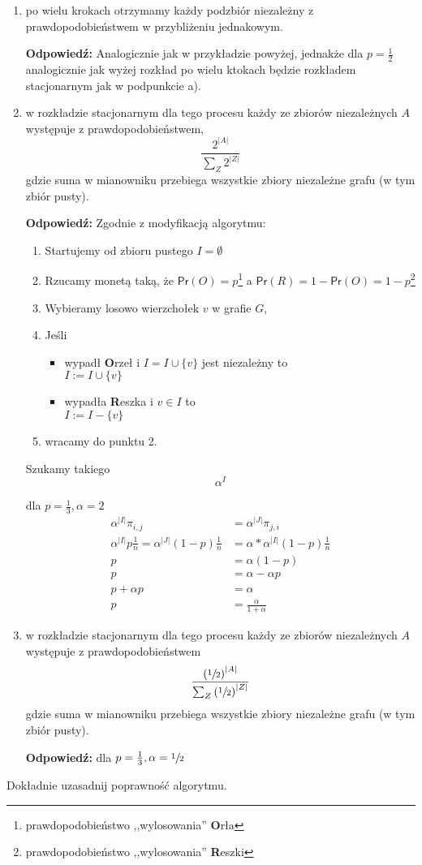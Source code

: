 \documentclass[a4paper,12pt]{article}
\theoremstyle{definition}%
\theoremstyle{definition}
\theoremstyle{problem}
\begin{document}
\begin{enumerate}[label=\alph*)]
\item po wielu krokach otrzymamy każdy podzbiór niezależny z prawdopodobieństwem w przybliżeniu jednakowym.

\textbf{Odpowiedź: }Analogicznie jak w przykładzie powyżej, jednakże dla $p= \frac{1}{2}$ analogicznie jak wyżej rozkład po wielu ktokach będzie rozkładem stacjonarnym jak w podpunkcie a).
\item w rozkładzie stacjonarnym dla tego procesu każdy ze zbiorów niezależnych $A$ występuje z prawdopodobieństwem, 
$$\frac{2^{|A|}}{\sum _Z2^{|Z|}}$$
gdzie suma w mianowniku przebiega wszystkie zbiory niezależne grafu (w tym zbiór pusty).

\textbf{Odpowiedź: } Zgodnie z modyfikacją algorytmu: 
\begin{enumerate}[label=\arabic*.]
\item Startujemy od zbioru pustego $I=\emptyset $
\item Rzucamy monetą taką, że $\mathsf{Pr}(O)=p$\footnote{prawdopodobieństwo ,,wylosowania'' \textbf{O}rła} a $\mathsf{Pr}(R)=1-\mathsf{Pr}(O)=1-p$\footnote{prawdopodobieństwo ,,wylosowania'' \textbf{R}eszki}
\item Wybieramy losowo wierzchołek $v$ w grafie $G$,
\item Jeśli 
\begin{itemize}
\item[] wypadł \textbf{O}rzeł i $I=I\cup \{v\}$ jest niezależny to\\
$I:=I\cup \{v\}$
\item[] wypadła \textbf{R}eszka i $v\in I$ to\\
$I:=I- \{v\}$
\end{itemize}
\item wracamy do punktu 2.
\end{enumerate}

Szukamy takiego $$\alpha ^I$$


dla $p=\frac{1}{3}, \alpha =2$ 
\begin{align*}
\alpha ^{|I|}\pi_{i,j}&=\alpha ^{|J|}\pi_{j,i}\\
\alpha ^{|I|}p\frac{1}{n}=\alpha ^{|J|}(1-p)\frac{1}{n}&=\alpha *\alpha ^{|I|}(1-p)\frac{1}{n}\\
p&=\alpha (1-p)\\
p&=\alpha -\alpha p\\
p+\alpha p&=\alpha\\
p&=\frac{\alpha}{1+\alpha}
\end{align*}


\item w rozkładzie stacjonarnym dla tego procesu każdy ze zbiorów niezależnych $A$ występuje z prawdopodobieństwem $$\frac{\left(\sfrac{1}{2}\right)^{|A|}}{\sum _Z \left(\sfrac{1}{2}\right)^{|Z|}}$$
gdzie suma w mianowniku przebiega wszystkie zbiory niezależne grafu (w tym zbiór pusty).

\textbf{Odpowiedź: }dla $p=\frac{1}{3}, \alpha =\sfrac{1}{2}$ 
\end{enumerate}
Dokładnie uzasadnij poprawność algorytmu.
\end{document}
